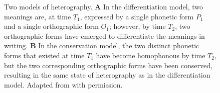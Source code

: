 \documentclass[doc,biblatex]{apa7}
\begin{document}
	\begin{figure}
	\vspace*{2pt}
	\caption{Two models of heterography. \textbf{A} In the differentiation model, two meanings are, at time $T_1$, expressed by a single phonetic form $P_1$ and a single orthographic form $O_1$; however, by time $T_2$, two orthographic forms have emerged to differentiate the meanings in writing. \textbf{B} In the conservation model, the two distinct phonetic forms that existed at time $T_1$ have become homophonous by time $T_2$, but the two corresponding orthographic forms have been conserved, resulting in the same state of heterography as in the differentiation model. Adapted from \textcite[pp.~325--326]{Berg:2021} with permission.}
	\label{fig01}
	\end{figure}
\end{document}
